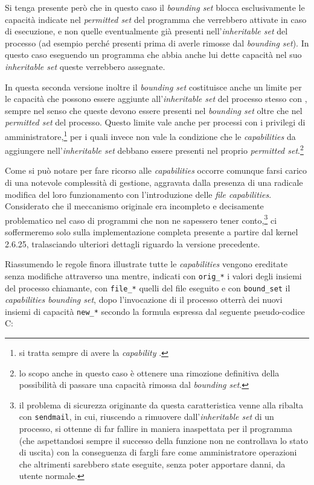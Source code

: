 Si tenga presente però che in questo caso il \textit{bounding set} blocca
esclusivamente le capacità indicate nel \textit{permitted set} del programma
che verrebbero attivate in caso di esecuzione, e non quelle eventualmente già
presenti nell'\textit{inheritable set} del processo (ad esempio perché
presenti prima di averle rimosse dal \textit{bounding set}). In questo caso
eseguendo un programma che abbia anche lui dette capacità nel suo
\textit{inheritable set} queste verrebbero assegnate.

In questa seconda versione inoltre il \textit{bounding set} costituisce anche
un limite per le capacità che possono essere aggiunte all'\textit{inheritable
  set} del processo stesso con , sempre nel senso che queste
devono essere presenti nel \textit{bounding set} oltre che nel
\textit{permitted set} del processo. Questo limite vale anche per processi con
i privilegi di amministratore,\footnote{si tratta sempre di avere la
  \textit{capability} .} per i quali invece non vale la
condizione che le \textit{capabilities} da aggiungere nell'\textit{inheritable
  set} debbano essere presenti nel proprio \textit{permitted set}.\footnote{lo
  scopo anche in questo caso è ottenere una rimozione definitiva della
  possibilità di passare una capacità rimossa dal \textit{bounding set}.}

Come si può notare per fare ricorso alle \textit{capabilities} occorre
comunque farsi carico di una notevole complessità di gestione, aggravata dalla
presenza di una radicale modifica del loro funzionamento con l'introduzione
delle \textit{file capabilities}. Considerato che il meccanismo originale era
incompleto e decisamente problematico nel caso di programmi che non ne
sapessero tener conto,\footnote{il problema di sicurezza originante da questa
  caratteristica venne alla ribalta con \texttt{sendmail}, in cui, riuscendo a
  rimuovere  dall'\textit{inheritable set} di un processo,
  si ottenne di far fallire  in maniera inaspettata per il
  programma (che aspettandosi sempre il successo della funzione non ne
  controllava lo stato di uscita) con la conseguenza di fargli fare come
  amministratore operazioni che altrimenti sarebbero state eseguite, senza
  poter apportare danni, da utente normale.}  ci soffermeremo solo sulla
implementazione completa presente a partire dal kernel 2.6.25, tralasciando
ulteriori dettagli riguardo la versione precedente.

Riassumendo le regole finora illustrate tutte le \textit{capabilities} vengono
ereditate senza modifiche attraverso una  mentre, indicati con
\texttt{orig\_*} i valori degli insiemi del processo chiamante, con
\texttt{file\_*} quelli del file eseguito e con \texttt{bound\_set} il
\textit{capabilities bounding set}, dopo l'invocazione di  il
processo otterrà dei nuovi insiemi di capacità \texttt{new\_*} secondo la
formula espressa dal seguente pseudo-codice C:

